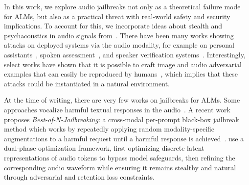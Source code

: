  In this work, we explore audio jailbreaks not only as a theoretical failure mode for ALMs, but also as a practical threat with real-world safety and security implications. To account for this, we incorporate ideas about stealth and psychacoustics in audio signals from~\citet{schönherr2018adversarialattacksautomaticspeech}.
There have been many works showing attacks on deployed systems via the audio modality, for example on personal assistants~\citep{commercialattack}, spoken assessment~\citep{rainaassessment}, and speaker verification systems~\citep{speakerverification}. 
Interestingly, select works have shown that it is possible to craft image and audio adversarial examples that can easily be reproduced by humans~\citep{khachaturov2023humanproducible, ahmed2023tubesusanalogattack}, which implies that these attacks could be instantiated in a natural environment. 

 At the time of writing, there are very few works on jailbreaks for ALMs. Some approaches vocalize harmful textual responses in the audio~\cite{yang2024audioachillesheelred, shen2024voicejailbreakattacksgpt4o}.
A recent work proposes \textit{Best-of-N-Jailbreaking}: a cross-modal per-prompt black-box jailbreak method which works by repeatedly applying random modality-specific augmentations to a harmful request until a harmful response is achieved~\cite{hughes2024bestofnjailbreaking}. 
\citet{kang2024advwavestealthyadversarialjailbreak} use a dual-phase optimization framework, first optimizing discrete latent representations of audio tokens to bypass model safeguards, then refining the corresponding audio waveform while ensuring it remains stealthy and natural through adversarial and retention loss constraints.


